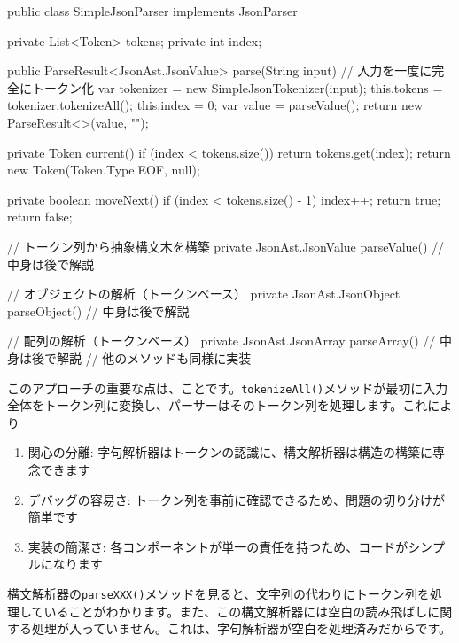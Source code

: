 \begin{codescreen}{}
public class SimpleJsonParser implements JsonParser {
    private List<Token> tokens;
    private int index;

    public ParseResult<JsonAst.JsonValue> parse(String input) {
        // 入力を一度に完全にトークン化
        var tokenizer = new SimpleJsonTokenizer(input);
        this.tokens = tokenizer.tokenizeAll();
        this.index = 0;
        var value = parseValue();
        return new ParseResult<>(value, "");
    }
    
    private Token current() {
        if (index < tokens.size()) {
            return tokens.get(index);
        }
        return new Token(Token.Type.EOF, null);
    }
    
    private boolean moveNext() {
        if (index < tokens.size() - 1) {
            index++;
            return true;
        }
        return false;
    }

    // トークン列から抽象構文木を構築
    private JsonAst.JsonValue parseValue() {
        // 中身は後で解説
    }

    // オブジェクトの解析（トークンベース）
    private JsonAst.JsonObject parseObject() {
        // 中身は後で解説
    }
    
    // 配列の解析（トークンベース）
    private JsonAst.JsonArray parseArray() {
        // 中身は後で解説
    }
    // 他のメソッドも同様に実装
}
\end{codescreen}

このアプローチの重要な点は、ことです。\texttt{tokenizeAll()}メソッドが最初に入力全体をトークン列に変換し、パーサーはそのトークン列を処理します。これにより

\begin{enumerate}
\item
  関心の分離:
  字句解析器はトークンの認識に、構文解析器は構造の構築に専念できます
\item
  デバッグの容易さ:
  トークン列を事前に確認できるため、問題の切り分けが簡単です
\item
  実装の簡潔さ:
  各コンポーネントが単一の責任を持つため、コードがシンプルになります
\end{enumerate}

構文解析器の\texttt{parseXXX()}メソッドを見ると、文字列の代わりにトークン列を処理していることがわかります。また、この構文解析器には空白の読み飛ばしに関する処理が入っていません。これは、字句解析器が空白を処理済みだからです。

